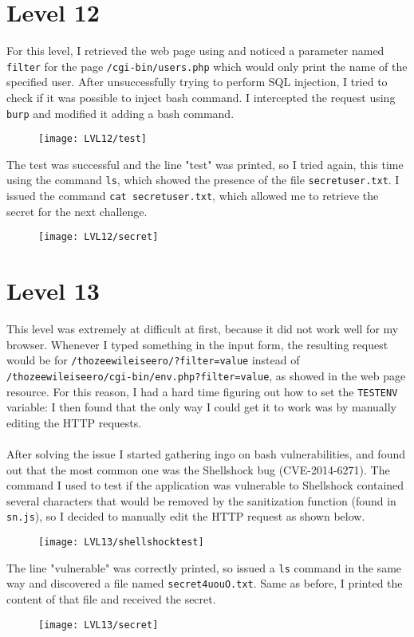 \documentclass[12pt,a4paper]{article}
\begin{document}
	\section*{Level 12}
For this level, I retrieved the web page using  and noticed a parameter named \texttt{filter} for the page \texttt{/cgi-bin/users.php} which would only print the name of the specified user. After unsuccessfully trying to perform SQL injection, I tried to check if it was possible to inject bash command. I intercepted the request using \texttt{burp} and modified it adding a bash command.
	\begin{figure}[H]
		\centering
		\texttt{[image: LVL12/test]}
		\label{fig:test12}
	\end{figure}
 	The test was successful and the line "test" was printed, so I tried again, this time using the command \texttt{ls}, which showed the presence of the file \texttt{secretuser.txt}. I issued the command \texttt{cat secretuser.txt}, which allowed me to retrieve the secret for the next challenge.
	\begin{figure}[H]
		\centering
		\texttt{[image: LVL12/secret]}
		\label{fig:secret12}
	\end{figure}

	\section*{Level 13}

	This level was extremely at difficult at first, because it did not work well for my browser. Whenever I typed something in the input form, the resulting request would be for \texttt{/thozeewileiseero/?filter=value} instead of \texttt{/thozeewileiseero/cgi-bin/env.php?filter=value}, as showed in the web page resource. For this reason, I had a hard time figuring out how to set the \texttt{TESTENV} variable: I then found that the only way I could get it to work was by manually editing the HTTP requests.\\\\After solving the issue I started gathering ingo on bash vulnerabilities, and found out that the most common one was the Shellshock bug (CVE-2014-6271).
	The command I used to test if the application was vulnerable to Shellshock contained several characters that would be removed by the sanitization function (found in \texttt{sn.js}), so I decided to manually edit the HTTP request as shown below.
	\begin{figure}[H]
		\centering
		\texttt{[image: LVL13/shellshocktest]}
		\label{fig:test13}
	\end{figure}
	The line "vulnerable" was correctly printed, so issued a \texttt{ls} command in the same way and discovered a file named \texttt{secret4uouO.txt}. Same as before, I printed the content of that file and received the secret.
	\begin{figure}[H]
		\centering
		\texttt{[image: LVL13/secret]}
		\label{fig:secret13}
	\end{figure}
	
\end{document}
